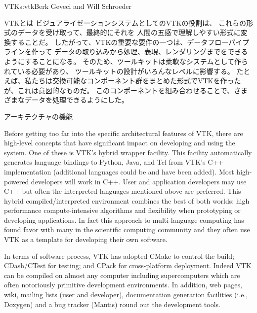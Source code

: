 \begin{aosachapter}{VTK}{s:vtk}{Berk Geveci and Will Schroeder}
\begin{aosasect1}{VTKとは}
ビジュアライゼーションシステムとしてのVTKの役割は、
これらの形式のデータを受け取って、最終的にそれを
人間の五感で理解しやすい形式に変換することだ。
したがって、VTKの重要な要件の一つは、データフローパイプラインを作って
データの取り込みから処理、表現、レンダリングまでをできるようにすることになる。
そのため、ツールキットは柔軟なシステムとして作られている必要があり、
ツールキットの設計がいろんなレベルに影響する。
たとえば、私たちは交換可能なコンポーネント群をまとめた形式でVTKを作ったが、これは意図的なものだ。
このコンポーネントを組み合わせることで、さまざまなデータを処理できるようにした。

\end{aosasect1}

\begin{aosasect1}{アーキテクチャの機能}

Before getting too far into the specific architectural features of
VTK, there are high-level concepts that have significant impact on
developing and using the system. One of these is VTK's hybrid wrapper
facility. This facility automatically generates language bindings to
Python, Java, and Tcl from VTK's C++ implementation (additional
languages could be and have been added). Most high-powered developers
will work in C++. User and application developers may use C++ but
often the interpreted languages mentioned above are preferred. This
hybrid compiled/interpreted environment combines the best of both
worlds: high performance compute-intensive algorithms and flexibility
when prototyping or developing applications. In fact this approach to
multi-language computing has found favor with many in the scientific
computing community and they often use VTK as a template for
developing their own software.

In terms of software process, VTK has adopted CMake to control the
build; CDash/CTest for testing; and CPack for cross-platform
deployment. Indeed VTK can be compiled on almost any computer
including supercomputers which are often notoriously primitive
development environments. In addition, web pages, wiki, mailing lists
(user and developer), documentation generation facilities (i.e.,
Doxygen) and a bug tracker (Mantis) round out the development tools.


\end{aosasect1}
\end{aosachapter}
